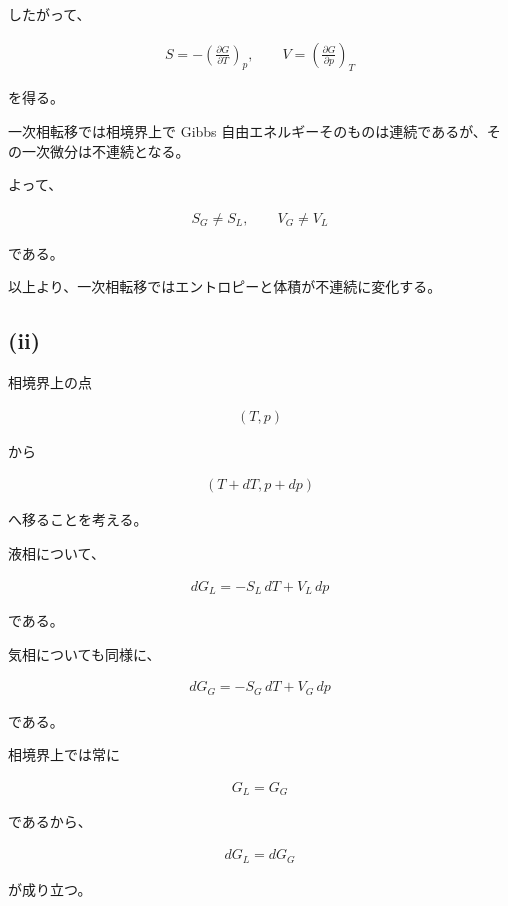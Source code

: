 \documentclass[platex,dvipdfmx,a4paper]{jsarticle}
\begin{document}
したがって、

\begin{align*}
S
=
-\left(
\frac{\partial G}{\partial T}
\right)_p,
\qquad
V
=
\left(
\frac{\partial G}{\partial p}
\right)_T
\end{align*}

を得る。

一次相転移では相境界上で Gibbs 自由エネルギーそのものは連続であるが、その一次微分は不連続となる。

よって、

\begin{align*}
S_G\neq S_L,
\qquad
V_G\neq V_L
\end{align*}

である。

以上より、一次相転移ではエントロピーと体積が不連続に変化する。

\subsection{(ii)}

相境界上の点

\begin{align*}
(T,p)
\end{align*}

から

\begin{align*}
(T+dT,p+dp)
\end{align*}

へ移ることを考える。

液相について、

\begin{align*}
dG_L
=
-S_L\,dT+V_L\,dp
\end{align*}

である。

気相についても同様に、

\begin{align*}
dG_G
=
-S_G\,dT+V_G\,dp
\end{align*}

である。

相境界上では常に

\begin{align*}
G_L=G_G
\end{align*}

であるから、

\begin{align*}
dG_L=dG_G
\end{align*}

が成り立つ。
\end{document}
